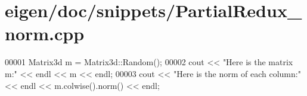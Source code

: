 \hypertarget{eigen_2doc_2snippets_2_partial_redux__norm_8cpp_source}{}\section{eigen/doc/snippets/\+Partial\+Redux\+\_\+norm.cpp}
\label{eigen_2doc_2snippets_2_partial_redux__norm_8cpp_source}

\begin{DoxyCode}
00001 Matrix3d m = Matrix3d::Random();
00002 cout << \textcolor{stringliteral}{"Here is the matrix m:"} << endl << m << endl;
00003 cout << \textcolor{stringliteral}{"Here is the norm of each column:"} << endl << m.colwise().norm() << endl;
\end{DoxyCode}
